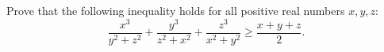 Prove that the following inequality holds for all positive real numbers $x,y,z$:\[\dfrac{x^3}{y^2+z^2}+\dfrac{y^3}{z^2+x^2}+\dfrac{z^3}{x^2+y^2}\ge \dfrac{x+y+z}{2}.\]